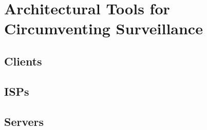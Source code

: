\section{Architectural Tools for Circumventing Surveillance}
\label{architecture}

\subsection{Clients}

\subsection{ISPs}

\subsection{Servers}
